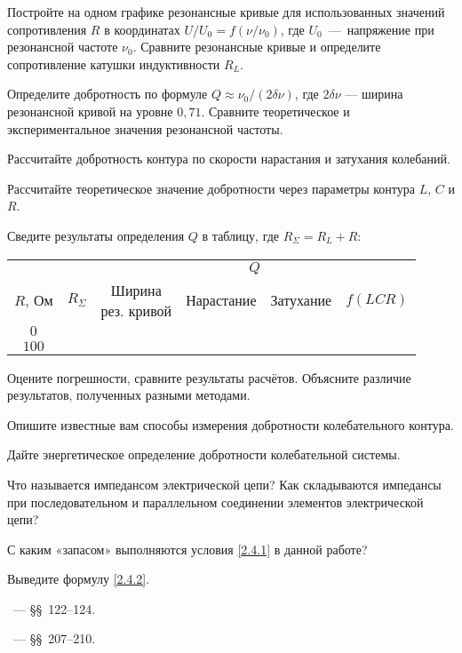 \begin{lab:task}
	\item Постройте на одном графике резонансные кривые для использованных значений
    сопротивления $R$ в координатах $U/U_0 = f(\nu/\nu_0)$, 
    где $U_0$~---~напряжение при резонансной частоте $\nu_0$.
    Сравните резонансные кривые и определите сопротивление катушки индуктивности
    $R_L$.
    \item Определите добротность по формуле $Q \approx \nu_0/(2\delta\nu)$,
    где $2\delta \nu$ --- ширина резонансной кривой на уровне $0,71$.
    Сравните теоретическое и экспериментальное значения резонансной частоты.

	\item Рассчитайте добротность контура по скорости нарастания и затухания
колебаний.

	\item Рассчитайте теоретическое значение добротности через параметры
контура $L$, $C$ и $R$.

\item Сведите результаты определения $Q$ в таблицу, где $R_{\Sigma}=R_L+R$:
\begin{center}
\begin{tabular}{|c|c|c|c|c|c|}
\hline
& & \multicolumn{4}{c|}{$Q$}\\
\cline{3-6}
$R$, Ом & $R_{\Sigma}$ & 
\parbox{2cm}{Ширина\\[-4pt] рез. кривой} & Нарастание & Затухание &$f(LCR)$\\
\hline
$0$ & & & & & \\
$100$ & & & & &\\
\hline
\end{tabular}
\end{center}
%
	\item Оцените погрешности, сравните результаты расчётов. Объясните
    различие результатов, полученных разными методами.
\end{lab:task}


\begin{lab:questions}
    \item Опишите известные вам способы измерения добротности колебательного контура.
    \item Дайте энергетическое определение добротности колебательной системы.
    \item Что называется импедансом электрической цепи?
        Как складываются импедансы при последовательном и параллельном
        соединении элементов электрической цепи?
    \item С каким «запасом» выполняются условия \eqref{2.4.1} в данной работе?
    \item Выведите формулу \eqref{2.4.2}.
\end{lab:questions}


\begin{lab:literature}
	\item \SivuhinIII~--- \S\S~122--124.

	\item \Kalashnikov~--- \S\S~207--210.
\end{lab:literature}

